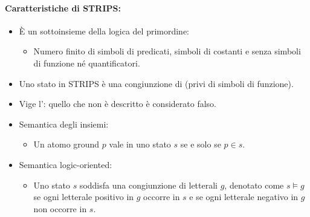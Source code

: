 
\paragraph{Caratteristiche di STRIPS:}

\begin{itemize}
  \item È un sottoinsieme della logica del primordine: 
    \begin{itemize}
      \item Numero finito di simboli di predicati, simboli di costanti e senza simboli di funzione né quantificatori.
    \end{itemize}
  \item Uno stato in STRIPS è una congiunzione di  (privi di simboli di funzione). 
  \item Vige l': quello che non è descritto è considerato falso.
  \item Semantica degli insiemi:
    \begin{itemize}
      \item Un atomo ground $p$ vale in uno stato $s$ se e solo se $p \in s$. 
    \end{itemize}
  \item Semantica logic-oriented: 
    \begin{itemize}
      \item Uno stato $s$ soddisfa una congiunzione di letterali $g$, denotato come $s \vDash g$ se ogni letterale positivo in $g$ occorre in $s$ e se ogni letterale negativo in $g$ non occorre in $s$. 
    \end{itemize}
\end{itemize}

